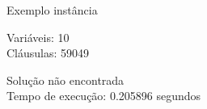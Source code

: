 \documentclass[compress,aspectratio=169]{beamer}
\begin{document}
    \begin{frame}{Exemplo instância}
        \begin{tcolorbox}[title=Entrada da instância, width=\linewidth, fontupper=\ttfamily,  halign=flush left]
            Variáveis: 10 \\
            Cláusulas: 59049
        \end{tcolorbox}
        \begin{tcolorbox}[title=Saída da instância, width=\linewidth, fontupper=\ttfamily, halign=flush left]
            Solução não encontrada \\
            Tempo de execução: 0.205896 segundos
        \end{tcolorbox}
    \end{frame}
\end{document}
